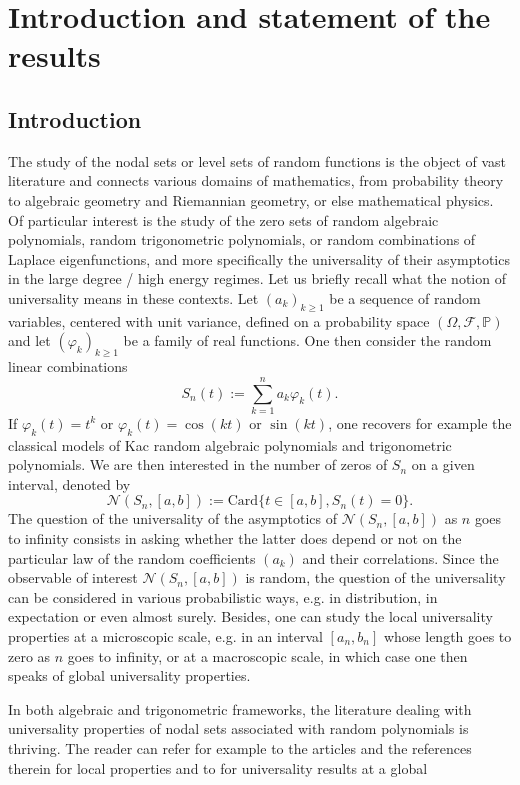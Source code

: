 \documentclass{svproc}
\newcommand{\Prob}{\mathbb{P}}
\begin{document}
\section{Introduction and statement of the results}

\subsection{Introduction}
The study of the nodal sets or level sets of random functions is the object of vast literature and connects various domains of mathematics, from probability theory to algebraic geometry and Riemannian geometry, or else mathematical physics. Of particular interest is the study of the zero sets of random algebraic polynomials,  random trigonometric polynomials, or random combinations of Laplace eigenfunctions, and more specifically the universality of their asymptotics in the large degree / high energy regimes. 
Let us briefly recall what the notion of universality means in these contexts.
Let $(a_k)_{k\geq 1}$ be a sequence of random variables, centered with unit variance, defined on a probability space $(\Omega,\mathcal{F},\Prob)$ and let $(\varphi_k)_{k\geq 1}$ be a family of real functions. One then consider the random linear combinations
$$S_n(t) :=\sum_{k=1}^{n}a_k \varphi_k(t).$$
If $\varphi_k(t)=t^{k}$ or $\varphi_k(t) =\cos(kt)$ or $\sin(kt)$, one recovers for example the classical models of Kac random algebraic polynomials and trigonometric polynomials. We are then interested in the number of zeros of $S_n$ on a given interval, denoted by
\[
\mathcal{N}(S_n,[a,b]) :=\text{Card}\{t\in[a,b], S_n(t)=0\}.
\]
The question of the universality of the asymptotics of $\mathcal{N}(S_n,[a,b])$ as $n$ goes to infinity consists in asking whether the latter does depend or not on the particular law of the random coefficients $(a_k)$ and their correlations. Since the observable of interest $\mathcal{N}(S_n,[a,b])$ is random, the question of the universality can be considered in various probabilistic ways, e.g. in distribution, in expectation or even almost surely. Besides, one can study the local universality properties at a microscopic scale, e.g. in an interval $[a_n, b_n]$ whose length goes to zero as $n$ goes to infinity, or at a macroscopic scale, in which case one then speaks of global universality properties. 
\par
\medskip
In both algebraic and trigonometric frameworks, the literature dealing with universality properties of nodal sets associated with random polynomials is thriving. The reader can refer for example to the articles \cite{TV15,IKM16,NV18} and the references therein for local properties and to \cite{AP15,Fla17,ADP19,AP21,Mat12,DNV18,Muk19,ANP24} for universality results at a global  
\end{document}
